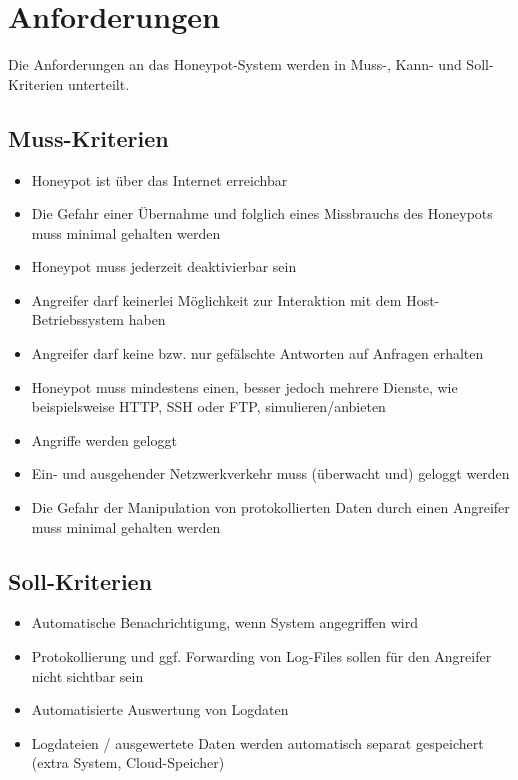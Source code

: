 \chapter{Anforderungen}
\label{ch:Anforderungen}

Die Anforderungen an das Honeypot-System werden in Muss-, Kann- und Soll-Kriterien unterteilt.


\section{Muss-Kriterien}
\label{sec:Muss-Kriterien}
\begin{itemize}
\item Honeypot ist über das Internet erreichbar
\item Die Gefahr einer Übernahme und folglich eines Missbrauchs des Honeypots muss minimal gehalten werden
\item Honeypot muss jederzeit deaktivierbar sein
\item Angreifer darf keinerlei Möglichkeit zur Interaktion mit dem Host-Betriebssystem haben
\item Angreifer darf keine bzw. nur gefälschte Antworten auf Anfragen erhalten
\item Honeypot muss mindestens einen, besser jedoch mehrere Dienste, wie beispielsweise HTTP, SSH oder FTP, simulieren/anbieten
\item Angriffe werden geloggt
\item Ein- und ausgehender Netzwerkverkehr muss (überwacht und) geloggt werden
\item Die Gefahr der Manipulation von protokollierten Daten durch einen Angreifer muss minimal gehalten werden

\end{itemize}

\newpage

\section{Soll-Kriterien}
\label{sec:Soll-Kriterien}
\begin{itemize}
\item Automatische Benachrichtigung, wenn System angegriffen wird
\item Protokollierung und ggf. Forwarding von Log-Files sollen für den Angreifer nicht sichtbar sein
\item Automatisierte Auswertung von Logdaten
\item Logdateien / ausgewertete Daten werden automatisch separat gespeichert (extra System, Cloud-Speicher)
\end{itemize}


